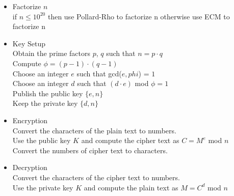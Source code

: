 \documentclass{exam}
\newcommand\tab[1][0.2cm]{\hspace*{#1}}
\begin{document}
\begin{itemize}
    \item Factorize $n$ \vspace{0.05in} \\
    \tab if $ n \le 10^{20}$ then use Pollard-Rho to factorize n otherwise use ECM to factorize n
    \item Key Setup \vspace{0.05in} \\
    \tab Obtain the prime factors $p$, $q$ such that $n = p \cdot q$ \vspace{0.05in} \\
    \tab Compute $\phi = (p - 1) \cdot (q - 1)$ \vspace{0.05in} \\
    \tab Choose an integer $e$ such that gcd($e, phi$) = $1$ \vspace{0.05in} \\
    \tab Choose an integer $d$ such that $(d \cdot e)$ mod $\phi = 1$ \vspace{0.05in} \\
    \tab Publish the public key $\{e, n\}$ \vspace{0.05in} \\
    \tab Keep the private key $\{d, n\}$
    \item Encryption \vspace{0.05in} \\
    \tab Convert the characters of the plain text to numbers. \vspace{0.05in} \\
    \tab Use the public key $K$ and compute the cipher text as $C = M^e$ mod $n$ \vspace{0.05in} \\
    \tab Convert the numbers of cipher text to characters.
    \item Decryption \vspace{0.05in} \\
    \tab Convert the characters of the cipher text to numbers. \vspace{0.05in} \\
    \tab Use the private key $K$ and compute the plain text as $M = C^d$ mod $n$ \vspace{0.05in}
\end{itemize}
\end{document}
